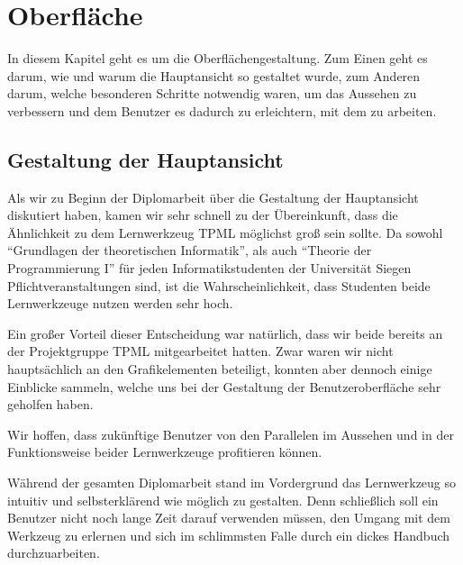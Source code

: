 

\chapter{Oberfläche}\label{GUI}

In diesem Kapitel geht es um die Oberflächengestaltung. Zum Einen geht es darum,
wie und warum die Hauptansicht so gestaltet wurde, zum Anderen darum, welche
besonderen Schritte notwendig waren, um das Aussehen zu verbessern und dem
Benutzer es dadurch zu erleichtern, mit dem \gtitool zu arbeiten.
\vspace{10pt}


\section{Gestaltung der Hauptansicht}\label{GUIMain}

Als wir zu Beginn der Diplomarbeit über die Gestaltung der Hauptansicht
diskutiert haben, kamen wir sehr schnell zu der Übereinkunft, dass die
Ähnlichkeit zu dem Lernwerkzeug TPML möglichst groß sein sollte. Da sowohl
"`Grundlagen der theoretischen Informatik"', als auch "`Theorie der
Programmierung I"' für jeden Informatikstudenten der Universität Siegen
Pflichtveranstaltungen sind, ist die Wahrscheinlichkeit, dass Studenten beide
Lernwerkzeuge nutzen werden sehr hoch.\vspace{10pt}

Ein großer Vorteil dieser Entscheidung war natürlich, dass wir beide
bereits an der Projektgruppe TPML mitgearbeitet hatten. Zwar waren wir nicht
hauptsächlich an den Grafikelementen beteiligt, konnten aber dennoch einige
Einblicke sammeln, welche uns bei der Gestaltung der Benutzeroberfläche sehr
geholfen haben.\vspace{10pt}

Wir hoffen, dass zukünftige Benutzer von den Parallelen im Aussehen
und in der Funktionsweise beider Lernwerkzeuge profitieren können.\vspace{10pt}

Während der gesamten Diplomarbeit stand im Vordergrund das Lernwerkzeug so
intuitiv und selbsterklärend wie möglich zu gestalten. Denn schließlich soll
ein Benutzer nicht noch lange Zeit darauf verwenden müssen, den Umgang mit dem
Werkzeug zu erlernen und sich im schlimmsten Falle durch ein dickes Handbuch
durchzuarbeiten.\vspace{10pt}

